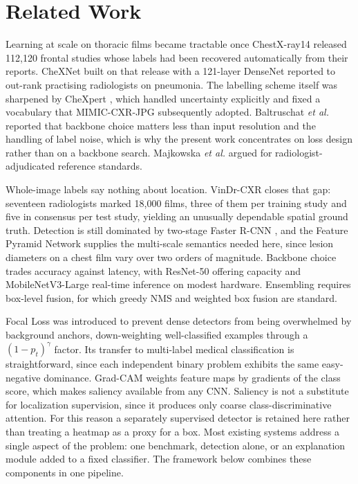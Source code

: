 \documentclass[conference]{IEEEtran}
\begin{document}
\section{Related Work}

Learning at scale on thoracic films became tractable once ChestX-ray14
\cite{wang2017} released 112,120 frontal studies whose labels had been recovered
automatically from their reports. CheXNet \cite{rajpurkar2017} built on that
release with a 121-layer DenseNet reported to out-rank practising radiologists
on pneumonia. The labelling scheme itself was sharpened by CheXpert
\cite{irvin2019}, which handled uncertainty explicitly and fixed a vocabulary
that MIMIC-CXR-JPG \cite{johnson2019jpg} subsequently adopted. Baltruschat
\textit{et al.} \cite{baltruschat2019} reported that backbone choice matters
less than input resolution and the handling of label noise, which is why the
present work concentrates on loss design rather than on a backbone search.
Majkowska \textit{et al.} \cite{majkowska2020} argued for
radiologist-adjudicated reference standards.

Whole-image labels say nothing about location. VinDr-CXR \cite{nguyen2022}
closes that gap: seventeen radiologists marked 18,000 films, three of them per
training study and five in consensus per test study, yielding an unusually
dependable spatial ground truth.
Detection is still dominated by two-stage Faster R-CNN \cite{ren2015}, and the
Feature Pyramid Network \cite{lin2017fpn} supplies the multi-scale semantics
needed here, since lesion diameters on a chest film vary over two orders of
magnitude. Backbone choice trades accuracy against latency, with ResNet-50
\cite{he2016} offering capacity and MobileNetV3-Large \cite{howard2019}
real-time inference on modest hardware. Ensembling requires box-level
fusion, for which greedy NMS and weighted box fusion \cite{solovyev2021} are
standard.

Focal Loss \cite{lin2017focal} was introduced to prevent dense detectors from
being overwhelmed by background anchors, down-weighting well-classified
examples through a $(1-p_t)^\gamma$ factor. Its transfer to multi-label medical
classification is straightforward, since each independent binary problem
exhibits the same easy-negative dominance. Grad-CAM \cite{selvaraju2017}
weights feature maps by gradients of the class score, which makes saliency
available from any CNN. Saliency is not a substitute for localization
supervision, since it produces only coarse class-discriminative attention. For
this reason a separately supervised detector is retained here rather than
treating a heatmap as a proxy for a box. Most existing systems address a single
aspect of the problem: one benchmark, detection alone, or an explanation module
added to a fixed classifier. The framework below combines these components in one
pipeline.
\end{document}
